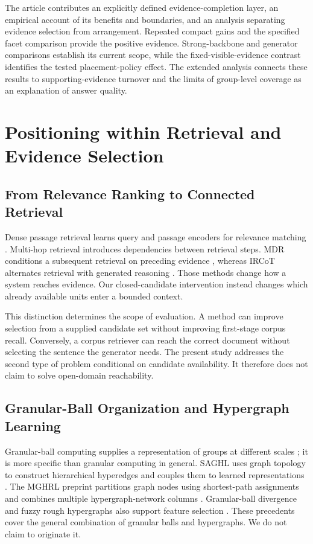 \documentclass[11pt,a4paper]{article}
\begin{document}
The article contributes an explicitly defined evidence-completion layer, an empirical
account of its benefits and boundaries, and an analysis separating evidence
selection from arrangement. Repeated compact gains and the specified facet
comparison provide the positive evidence. Strong-backbone and generator
comparisons establish its current scope, while the fixed-visible-evidence
contrast identifies the tested placement-policy effect. The extended analysis
connects these results to supporting-evidence turnover and the limits of
group-level coverage as an explanation of answer quality.

\section{Positioning within Retrieval and Evidence Selection}
\subsection{From Relevance Ranking to Connected Retrieval}
Dense passage retrieval learns query and passage encoders for relevance
matching \citep{karpukhin2020dpr}. Multi-hop retrieval introduces dependencies
between retrieval steps. MDR conditions a subsequent retrieval on preceding
evidence \citep{xiong2021mdr}, whereas IRCoT alternates retrieval with generated
reasoning \citep{trivedi2023ircot}. Those methods change how a system reaches
evidence. Our closed-candidate intervention instead changes which already
available units enter a bounded context.

This distinction determines the scope of evaluation. A method can improve
selection from a supplied candidate set without improving first-stage corpus
recall. Conversely, a corpus retriever can reach the correct document without
selecting the sentence the generator needs. The present study addresses the
second type of problem conditional on candidate availability. It therefore
does not claim to solve open-domain reachability.

\subsection{Granular-Ball Organization and Hypergraph Learning}
Granular-ball computing supplies a representation of groups at different
scales \citep{xia2019granularball}; it is more specific than granular
computing in general. SAGHL uses graph topology to construct hierarchical
hyperedges and couples them to learned representations \citep{ni2026saghl}.
The MGHRL preprint partitions graph nodes using shortest-path assignments
and combines multiple hypergraph-network columns \citep{zhao2026mghrl}.
Granular-ball divergence and fuzzy rough hypergraphs also support feature
selection \citep{li2026gbfrh}. These precedents cover the general combination
of granular balls and hypergraphs. We do not claim to originate it.
\end{document}
